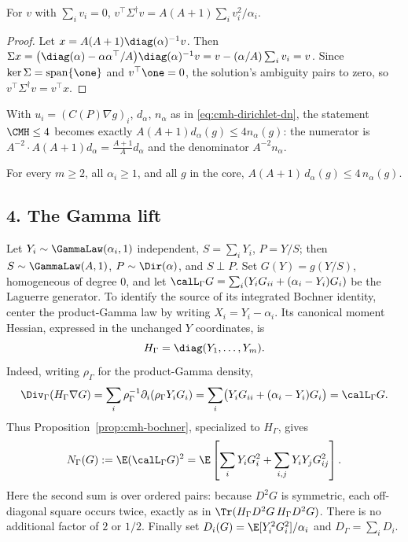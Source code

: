 \documentclass[../main.tex]{subfiles}
\begin{document}
\begin{lemma}
\label{lem:sol-dirichlet-pseudoinverse}
For $v$ with $\sum_iv_i=0$, $v^\top\Sigma^\dagger v=A(A+1)\sum_iv_i^2/\alpha_i$.
\end{lemma}

\begin{proof}
Let $x=A(A+1)\diag(\alpha)^{-1}v$. Then
$\Sigma x=\bigl(\diag(\alpha)-\alpha\alpha^\top/A\bigr)\diag(\alpha)^{-1}v
=v-(\alpha/A)\sum_iv_i=v$. Since $\ker\Sigma=\mathrm{span}\{\one\}$ and $v^\top\one=0$, the
solution's ambiguity pairs to zero, so $v^\top\Sigma^\dagger v=v^\top x$.
\end{proof}

With $u_i=(C(P)\nabla g)_i$, $d_\alpha$, $n_\alpha$ as in \eqref{eq:cmh-dirichlet-dn}, the
statement $\CMH\le4$ becomes exactly $A(A+1)d_\alpha(g)\le4n_\alpha(g)$: the numerator is
$A^{-2}\cdot A(A+1)d_\alpha=\tfrac{A+1}Ad_\alpha$ and the denominator $A^{-2}n_\alpha$.

\begin{theorem}[= Theorem~\ref{thm:cmh-dirichlet}]
\label{thm:sol-cmh-dirichlet}
For every $m\ge2$, all $\alpha_i\ge1$, and all $g$ in the core,
$A(A+1)\,d_\alpha(g)\le4\,n_\alpha(g)$.
\end{theorem}

\subsection*{4. The Gamma lift}

Let $Y_i\sim\GammaLaw(\alpha_i,1)$ independent, $S=\sum_iY_i$, $P=Y/S$; then
$S\sim\GammaLaw(A,1)$, $P\sim\Dir(\alpha)$, and $S\perp P$. Set $G(Y)=g(Y/S)$, homogeneous of
degree $0$, and let $\calL_\Gamma G=\sum_i(Y_iG_{ii}+(\alpha_i-Y_i)G_i)$ be the Laguerre
generator.  To identify the source of its integrated Bochner identity, center the product-Gamma
law by writing $X_i=Y_i-\alpha_i$.  Its canonical moment Hessian, expressed in the unchanged
$Y$ coordinates, is
\[
  H_\Gamma=\diag(Y_1,\ldots,Y_m).
\]
Indeed, writing $\rho_\Gamma$ for the product-Gamma density,
\[
  \Div_\Gamma(H_\Gamma\nabla G)
  =\sum_i\rho_\Gamma^{-1}\partial_i(\rho_\Gamma Y_iG_i)
  =\sum_i\bigl(Y_iG_{ii}+(\alpha_i-Y_i)G_i\bigr)=\calL_\Gamma G.
\]
Thus Proposition~\ref{prop:cmh-bochner}, specialized to $H_\Gamma$, gives
\begin{equation}
  N_\Gamma(G):=\E(\calL_\Gamma G)^2
  =\E\left[\sum_iY_iG_i^2+\sum_{i,j}Y_iY_jG_{ij}^2\right].
  \label{eq:sol-cmh-gamma-bochner}
\end{equation}
Here the second sum is over ordered pairs: because $D^2G$ is symmetric, each off-diagonal
square occurs twice, exactly as in
$\Tr(H_\Gamma D^2G\,H_\Gamma D^2G)$.  There is no additional factor of $2$ or $1/2$.
Finally set $D_i(G)=\E[Y_i^2G_i^2]/\alpha_i$ and $D_\Gamma=\sum_iD_i$.
\end{document}
